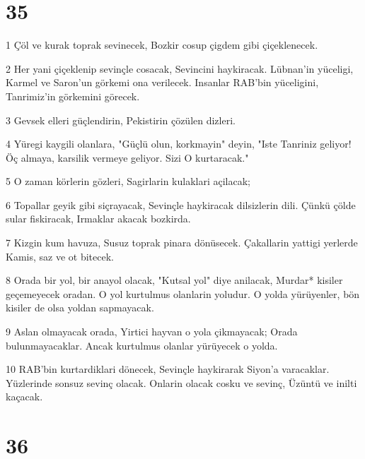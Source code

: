 \chapter{35}

\par 1 Çöl ve kurak toprak sevinecek, Bozkir cosup çigdem gibi çiçeklenecek.
\par 2 Her yani çiçeklenip sevinçle cosacak, Sevincini haykiracak. Lübnan'in yüceligi, Karmel ve Saron'un görkemi ona verilecek. Insanlar RAB'bin yüceligini, Tanrimiz'in görkemini görecek.
\par 3 Gevsek elleri güçlendirin, Pekistirin çözülen dizleri.
\par 4 Yüregi kaygili olanlara, "Güçlü olun, korkmayin" deyin, "Iste Tanriniz geliyor! Öç almaya, karsilik vermeye geliyor. Sizi O kurtaracak."
\par 5 O zaman körlerin gözleri, Sagirlarin kulaklari açilacak;
\par 6 Topallar geyik gibi siçrayacak, Sevinçle haykiracak dilsizlerin dili. Çünkü çölde sular fiskiracak, Irmaklar akacak bozkirda.
\par 7 Kizgin kum havuza, Susuz toprak pinara dönüsecek. Çakallarin yattigi yerlerde Kamis, saz ve ot bitecek.
\par 8 Orada bir yol, bir anayol olacak, "Kutsal yol" diye anilacak, Murdar* kisiler geçemeyecek oradan. O yol kurtulmus olanlarin yoludur. O yolda yürüyenler, bön kisiler de olsa yoldan sapmayacak.
\par 9 Aslan olmayacak orada, Yirtici hayvan o yola çikmayacak; Orada bulunmayacaklar. Ancak kurtulmus olanlar yürüyecek o yolda.
\par 10 RAB'bin kurtardiklari dönecek, Sevinçle haykirarak Siyon'a varacaklar. Yüzlerinde sonsuz sevinç olacak. Onlarin olacak cosku ve sevinç, Üzüntü ve inilti kaçacak.

\chapter{36}

